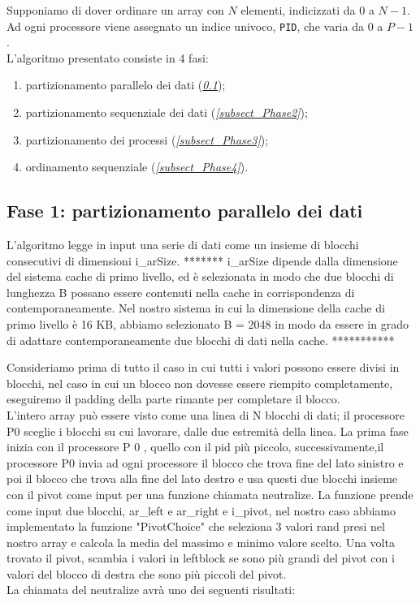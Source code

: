 Supponiamo di dover ordinare un array con $N$ elementi, indicizzati da $0$ a $N-1$. Ad ogni processore viene assegnato un indice univoco, \texttt{PID}, che varia da $0$ a $P-1$.\\
L'algoritmo presentato consiste in 4 fasi:
\begin{enumerate}
\item partizionamento parallelo dei dati (\textit{\ref{subsect_Phase1}});
\item partizionamento sequenziale dei dati (\textit{\ref{subsect_Phase2}});
\item partizionamento dei processi (\textit{\ref{subsect_Phase3}});
\item ordinamento sequenziale (\textit{\ref{subsect_Phase4}}).
\end{enumerate}
 
\subsection{Fase 1: partizionamento parallelo dei dati} \label{subsect_Phase1}

L'algoritmo legge in input una serie di dati come un insieme di blocchi consecutivi di dimensioni i\_arSize. 
******* 
i\_arSize dipende dalla dimensione del sistema cache di primo livello, ed è selezionata in modo che due blocchi di lunghezza B possano essere contenuti nella cache in corrispondenza di contemporaneamente. Nel nostro sistema in cui la dimensione della cache di primo livello è 16 KB, abbiamo selezionato
B = 2048 in modo da essere in grado di adattare contemporaneamente due blocchi di dati nella cache. 
***********

Consideriamo prima di tutto il caso in cui tutti i valori possono essere divisi in blocchi, nel caso in cui un blocco non dovesse essere riempito completamente, eseguiremo il padding della parte rimante per completare il blocco. \\
L'intero array può essere visto come una linea di N blocchi di dati; il processore P0 sceglie i blocchi su cui lavorare, dalle due estremità della linea.
La prima fase inizia con il processore P 0 , quello con il pid più piccolo, successivamente,il processore P0 invia ad ogni processore il blocco che trova fine del lato sinistro e poi il blocco che trova alla fine del lato destro e usa questi due blocchi insieme con il pivot come input per una funzione chiamata neutralize. La funzione prende come input due blocchi, ar\_left e ar\_right e i\_pivot, nel nostro caso abbiamo implementato la funzione "PivotChoice" che seleziona 3 valori rand presi nel nostro array e calcola la media del massimo e minimo valore scelto. Una volta trovato il pivot, scambia i valori in leftblock se sono più grandi del pivot con i valori del blocco di destra che sono più piccoli del pivot. \\
La chiamata del neutralize avrà uno dei seguenti risultati:

